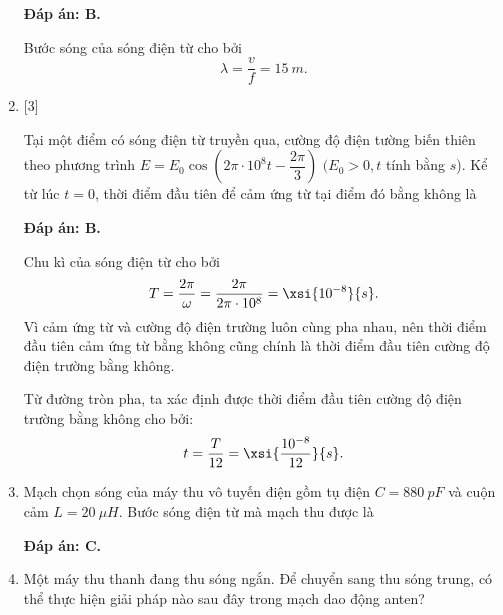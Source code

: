 \begin{enumerate}[label=\bfseries Câu \arabic*:]
	\loigiai
	{		\textbf{Đáp án: B.}
		
		Bước sóng của sóng điện từ cho bởi
		$$
		\lambda=\dfrac{v}{f}= \SI{15}{m}.
		$$
		
	}
	
	\item {} [3]
	
	\cauhoi
	{Tại một điểm có sóng điện từ truyền qua, cường độ điện tường biến thiên theo phương trình $E=E_{0} \cos \left(2 \pi \cdot 10^{8} t-\dfrac{2 \pi}{3}\right)$ $(E_{0}>0, t$ tính bằng $s$). Kể từ lúc $t=0$, thời điểm đầu tiên để cảm ứng từ tại điểm đó bằng không là
	}
	
	\loigiai
	{		\textbf{Đáp án: B.}
		
		Chu kì của sóng điện từ cho bởi
		$$
		T=\dfrac{2 \pi}{\omega}=\dfrac{2 \pi}{2 \pi \cdot 10^{8}}= \xsi{10^{-8}}{s}.
		$$
		Vì cảm ứng từ và cường độ điện trường luôn cùng pha nhau, nên thời điểm đầu tiên cảm ứng từ bằng không cũng chính là thời điểm đầu tiên cường độ điện trường bằng không.
		
		Từ đường tròn pha, ta xác định được thời điểm đầu tiên cường độ điện trường bằng không cho bởi:
		$$
		t=\dfrac{T}{12}= \xsi{\dfrac{10^{-8}}{12}}{s}.
		$$
	}
		\item {} 
	\cauhoi
	{Mạch chọn sóng của máy thu vô tuyến điện gồm tụ điện $C = \SI{880}{pF}$ và cuộn cảm $L = \SI{20}{\mu H}$. Bước sóng điện từ mà mạch thu được là
		
	}
	
	\loigiai
	{		\textbf{Đáp án: C.}
		
	
	}
		\item {} 
	\cauhoi
	{Một máy thu thanh đang thu sóng ngắn. Để chuyển sang thu sóng trung, có thể thực hiện giải pháp nào sau đây trong mạch dao động anten?
		}
\end{enumerate}
